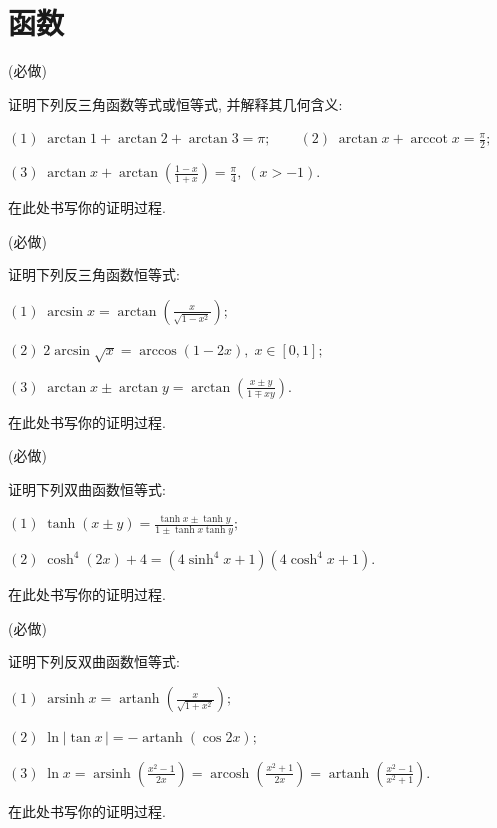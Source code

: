 \documentclass[answers, 10pt]{exam}
\begin{document}
\newpage

\section{函数}

\begin{questions}
	
	 (必做)
	
	证明下列反三角函数等式或恒等式, 并解释其几何含义:
	
	\smallskip
	$
	\displaystyle
	(1)\; \arctan 1 + \arctan 2 + \arctan 3 = \pi; \qquad
	(2)\; \arctan x + \operatorname{arccot} x = \frac{\pi}{2};
	$
	
	\smallskip
	$
	\displaystyle
	(3)\; \arctan x + \arctan\left(\frac{1-x}{1+x}\right) = \frac{\pi}{4},\; (x>-1).
	$
	
	\begin{solution}
		在此处书写你的证明过程.
	\end{solution}
	
	 (必做)
	
	证明下列反三角函数恒等式:
	
	\smallskip
	$
	\displaystyle
	(1)\; \arcsin x = \arctan\left(\frac{x}{\sqrt{1-x^2}}\right);		
	$
	
	\medskip
	$
	\displaystyle
	(2)\; 2\arcsin\sqrt{x} = \arccos(1-2x),\; x\in[0,1];
	$
	
	\medskip
	$
	\displaystyle
	(3)\; \arctan x \pm \arctan y = \arctan\left(\frac{x\pm y}{1\mp xy}\right).
	$
	
	\begin{solution}
		在此处书写你的证明过程.
	\end{solution}
	
	 (必做)
	
	证明下列双曲函数恒等式:
	
	\smallskip
	$
	\displaystyle
	(1)\; \tanh(x\pm y) = \frac{\tanh x\pm\tanh y}{1\pm\tanh x\tanh y};
	$
	
	\medskip
	$
	\displaystyle
	(2)\; \cosh^4(2x)+4 = (4\sinh^4\!x+1)(4\cosh^4\!x+1).
	$
		
	\begin{solution}
		在此处书写你的证明过程.
	\end{solution}
	
	 (必做)
	
	证明下列反双曲函数恒等式:
	
	\smallskip
	$
	\displaystyle
	(1)\; \operatorname{arsinh}x = \operatorname{artanh}\left(\frac{x}{\sqrt{1+x^2}}\right);
	$
	
	\medskip
	$
	\displaystyle
	(2)\; \ln|\tan x\,| = -\operatorname{artanh}(\cos2x);
	$
	
	\medskip
	$
	\displaystyle
	(3)\; \ln x = \operatorname{arsinh}\left(\frac{x^2-1}{2x}\right) = \operatorname{arcosh}\left(\frac{x^2+1}{2x}\right) = \operatorname{artanh}\left(\frac{x^2-1}{x^2+1}\right).
	$
	
	\begin{solution}
		在此处书写你的证明过程.
	\end{solution}
	
\end{questions}
\end{document}
